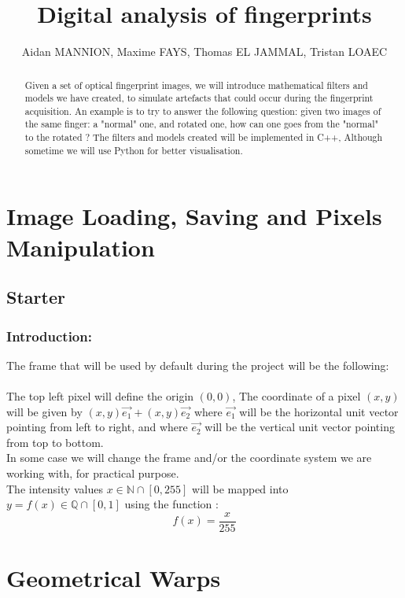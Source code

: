 \documentclass[]{report}
\title{Digital analysis of fingerprints}
\author{Aidan MANNION, Maxime FAYS, Thomas EL JAMMAL, Tristan LOAEC}
\begin{document}
\maketitle

\begin{abstract}

	
		
				Given a set of optical fingerprint images, we will introduce mathematical filters and models we have created, to simulate artefacts that could occur during the fingerprint acquisition. An example is to try to answer the following question: given two images of the same finger: a "normal" one, and rotated one, how can one goes from the "normal" to the rotated ? \linebreak
	The filters and models created will be implemented in C++, Although sometime we will use Python for better visualisation. 
		
	
 
\end{abstract}
\tableofcontents
\part{Image Loading, Saving and Pixels Manipulation}
\chapter{Starter}
\section{Introduction: }
The frame that will be used by default during the project will be the following: \\ \\
The top left pixel will define the origin $(0,0)$,
The coordinate of a pixel $(x,y)$ will be given by 
$(x,y)\vec{e_1} + (x,y)\vec{e_2}$ where $\vec{e_1}$ will be the horizontal unit vector pointing from left to right, and where $\vec{e_2}$ will be the vertical unit vector pointing from top to bottom. \\
In some case we will change the frame and/or the coordinate system we are working with, for practical purpose. \\ 
The intensity values $x \in \mathbb{N}\cap[0,255]$ will be mapped into $y=f(x) \in \mathbb{Q} \cap[0,1]$ using the function : $$f(x)=\frac{x}{255}$$

\part{Geometrical Warps}
\end{document}
